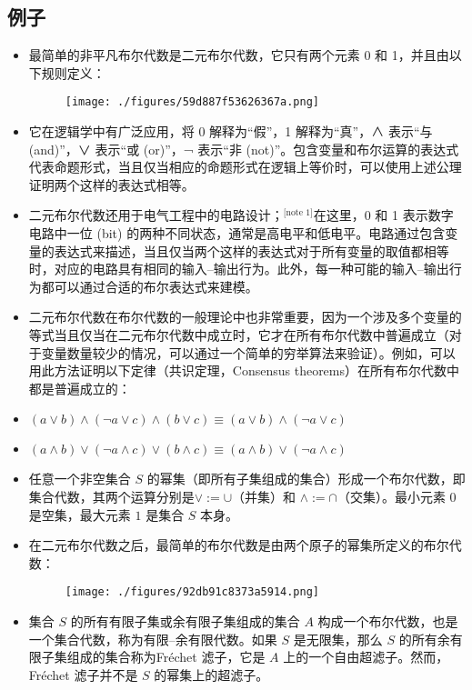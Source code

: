 \subsection{例子}
\begin{itemize}
\item 最简单的非平凡布尔代数是二元布尔代数，它只有两个元素 0 和 1，并且由以下规则定义：
\begin{figure}[ht]
\centering
\texttt{[image: ./figures/59d887f53626367a.png]}
\caption{} \label{fig_BRds_2}
\end{figure}
\item 它在逻辑学中有广泛应用，将 0 解释为“假”，1 解释为“真”，∧ 表示“与 (and)”，∨ 表示“或 (or)”，¬ 表示“非 (not)”。包含变量和布尔运算的表达式代表命题形式，当且仅当相应的命题形式在逻辑上等价时，可以使用上述公理证明两个这样的表达式相等。
\item 二元布尔代数还用于电气工程中的电路设计；\(^\text{[note 1]}\)在这里，0 和 1 表示数字电路中一位 (bit) 的两种不同状态，通常是高电平和低电平。电路通过包含变量的表达式来描述，当且仅当两个这样的表达式对于所有变量的取值都相等时，对应的电路具有相同的输入–输出行为。此外，每一种可能的输入–输出行为都可以通过合适的布尔表达式来建模。
\item 二元布尔代数在布尔代数的一般理论中也非常重要，因为一个涉及多个变量的等式当且仅当在二元布尔代数中成立时，它才在所有布尔代数中普遍成立（对于变量数量较少的情况，可以通过一个简单的穷举算法来验证）。例如，可以用此方法证明以下定律（共识定理，Consensus theorems）在所有布尔代数中都是普遍成立的：
\item $(a \lor b) \land (\lnot a \lor c) \land (b \lor c) \equiv (a \lor b) \land (\lnot a \lor c)$
\item $(a \land b) \lor (\lnot a \land c) \lor (b \land c) \equiv (a \land b) \lor (\lnot a \land c)$
\item 任意一个非空集合 $S$ 的幂集（即所有子集组成的集合）形成一个布尔代数，即集合代数，其两个运算分别是$\lor := \cup$（并集）和 $\land := \cap$（交集）。最小元素 $0$ 是空集，最大元素 $1$ 是集合 $S$ 本身。
\item 在二元布尔代数之后，最简单的布尔代数是由两个原子的幂集所定义的布尔代数：
\begin{figure}[ht]
\centering
\texttt{[image: ./figures/92db91c8373a5914.png]}
\caption{} \label{fig_BRds_3}
\end{figure}
\item 集合 $S$ 的所有有限子集或余有限子集组成的集合 $A$ 构成一个布尔代数，也是一个集合代数，称为有限–余有限代数。如果 $S$ 是无限集，那么 $S$ 的所有余有限子集组成的集合称为Fréchet 滤子，它是 $A$ 上的一个自由超滤子。然而，Fréchet 滤子并不是 $S$ 的幂集上的超滤子。

\end{itemize}
